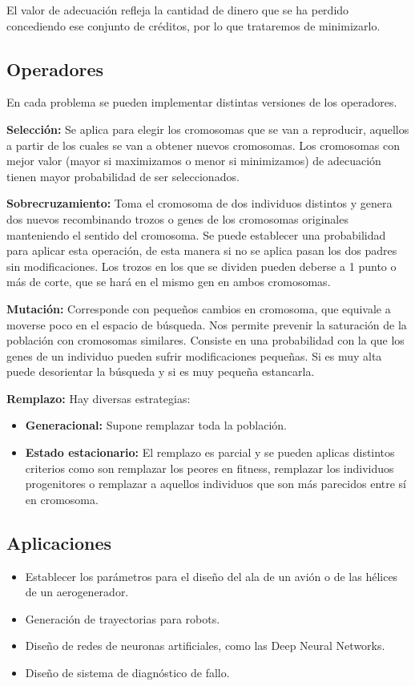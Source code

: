 \documentclass[12pt, twoside, openright]{report} %
\begin{document}
El valor de adecuación refleja la cantidad de dinero que se ha perdido concediendo ese conjunto de créditos, por lo que trataremos de minimizarlo.

\subsection{Operadores}
En cada problema se pueden implementar distintas versiones de los operadores.

\textbf{Selección:} Se aplica para elegir los cromosomas que se van a reproducir, aquellos a partir de los cuales se van a obtener nuevos cromosomas. Los cromosomas con mejor valor (mayor si maximizamos o menor si minimizamos) de adecuación tienen mayor probabilidad de ser seleccionados.

\textbf{Sobrecruzamiento:} Toma el cromosoma de dos individuos distintos y genera dos nuevos recombinando trozos o genes de los cromosomas originales manteniendo el sentido del cromosoma. Se puede establecer una probabilidad para aplicar esta operación, de esta manera si no se aplica pasan los dos padres sin modificaciones. Los trozos en los que se dividen pueden deberse a 1 punto o más de corte, que se hará en el mismo gen en ambos cromosomas.

\textbf{Mutación:} Corresponde con pequeños cambios en cromosoma, que equivale a moverse poco en el espacio de búsqueda. Nos permite prevenir la saturación de la población con cromosomas similares. Consiste en una probabilidad con la que los genes de un individuo pueden sufrir modificaciones pequeñas. Si es muy alta puede desorientar la búsqueda y si es muy pequeña estancarla.

\textbf{Remplazo:} Hay diversas estrategias:
\begin{itemize}
	\item \textbf{Generacional:} Supone remplazar toda la población.
	\item \textbf{Estado estacionario:} El remplazo es parcial y se pueden aplicas distintos criterios como son remplazar los peores en fitness, remplazar los individuos progenitores o remplazar a aquellos individuos que son más parecidos entre sí en cromosoma.
\end{itemize}

\subsection{Aplicaciones}
\begin{itemize}
	\item Establecer los parámetros para el diseño del ala de un avión o de las hélices de un aerogenerador.
	\item Generación de trayectorias para robots.
	\item Diseño de redes de neuronas artificiales, como las Deep Neural Networks.
	\item Diseño de sistema de diagnóstico de fallo.
\end{itemize}
\end{document}
